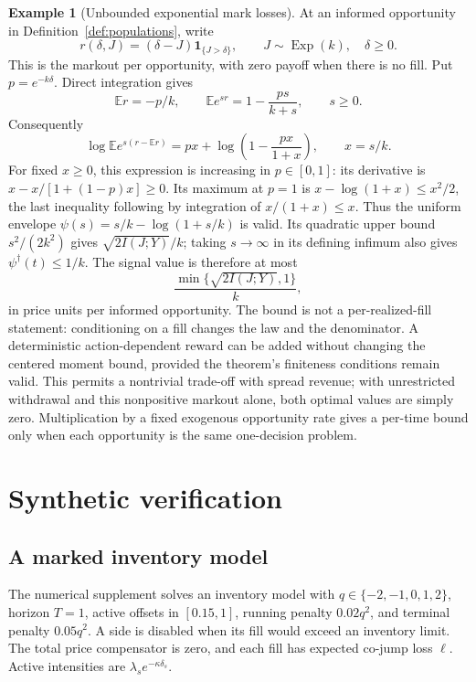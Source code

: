 \documentclass[11pt]{article}
\theoremstyle{plain}
\theoremstyle{definition}
\newtheorem{example}[theorem]{Example}
\theoremstyle{remark}
\newcommand{\E}{\mathbb E}
\begin{document}
\begin{example}[Unbounded exponential mark losses]
At an informed opportunity in Definition~\ref{def:populations}, write
\[
r(\delta,J)=(\delta-J)\mathbf1_{\{J>\delta\}},\qquad
J\sim\operatorname{Exp}(k),\quad\delta\ge0.
\]
This is the markout per opportunity, with zero payoff when there is
no fill. Put \(p=e^{-k\delta}\). Direct integration gives
\[
\E r=-p/k,\qquad
\E e^{sr}=1-\frac{ps}{k+s},\qquad s\ge0.
\]
Consequently
\[
\log\E e^{s(r-\E r)}=px+\log\left(1-\frac{px}{1+x}\right),
\qquad x=s/k.
\]
For fixed \(x\ge0\), this expression is increasing in \(p\in[0,1]\):
its derivative is \(x-x/[1+(1-p)x]\ge0\). Its maximum at \(p=1\)
is \(x-\log(1+x)\le x^2/2\), the last inequality following by
integration of \(x/(1+x)\le x\). Thus the uniform envelope
\(\psi(s)=s/k-\log(1+s/k)\) is valid. Its quadratic upper bound
\(s^2/(2k^2)\) gives \(\sqrt{2I(J;Y)}/k\); taking
\(s\to\infty\) in its defining infimum also gives
\(\psi^\dagger(t)\le1/k\). The signal value is therefore at most
\[
\frac{\min\{\sqrt{2I(J;Y)},1\}}{k},
\]
in price units per informed opportunity.
The bound is not a per-realized-fill statement: conditioning on a fill
changes the law and the denominator. A deterministic action-dependent
reward can be added without changing the centered moment bound, provided
the theorem's finiteness conditions remain valid. This permits a
nontrivial trade-off with spread revenue; with unrestricted withdrawal
and this nonpositive markout alone, both optimal values are simply zero.
Multiplication by a fixed exogenous opportunity rate gives a per-time
bound only when each opportunity is the same one-decision problem.
\end{example}

\section{Synthetic verification}

\subsection{A marked inventory model}

The numerical supplement solves an inventory model with
\(q\in\{-2,-1,0,1,2\}\), horizon \(T=1\), active offsets in
\([0.15,1]\), running penalty \(0.02q^2\), and terminal penalty
\(0.05q^2\). A side is disabled when its fill would exceed an inventory
limit. The total price compensator is zero, and each fill has expected
co-jump loss \(\ell\). Active intensities are
\(\lambda_s e^{-\kappa\delta_s}\).
\end{document}
